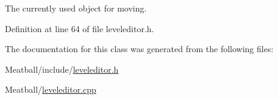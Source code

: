 The currently used object for moving. 



Definition at line 64 of file leveleditor.\-h.



The documentation for this class was generated from the following files\-:\begin{DoxyCompactItemize}
\item 
Meatball/include/\hyperlink{leveleditor_8h}{leveleditor.\-h}\item 
Meatball/\hyperlink{leveleditor_8cpp}{leveleditor.\-cpp}\end{DoxyCompactItemize}
